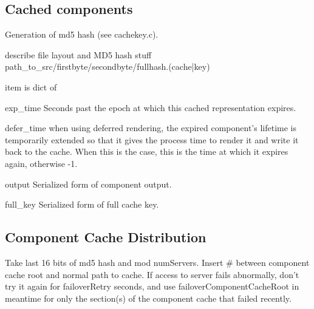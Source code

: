 \subsection{Cached components}
Generation of md5 hash (see cachekey.c). 

describe file layout and MD5 hash stuff
path\_to\_src/firstbyte/secondbyte/fullhash.(cache|key)

item is dict of 
\begin{argdesc}
\item[exp_time] Seconds past the epoch at which this cached
representation expires.
\item[defer_time] when using deferred rendering, the expired
component's lifetime is temporarily extended so that it gives the
process time to render it and write it back to the cache.  When this
is the case, this is the time at which it expires again, otherwise -1.
\item[output] Serialized form of component output.
\item[full_key] Serialized form of full cache key.
\end{argdesc}

\subsection{Component Cache Distribution}
Take last 16 bits of md5 hash and mod numServers.  Insert \# between
component cache root and normal path to cache.  If access to server
fails abnormally, don't try it again for failoverRetry seconds, and use
failoverComponentCacheRoot in meantime for only the section(s) of the
component cache that failed recently.

